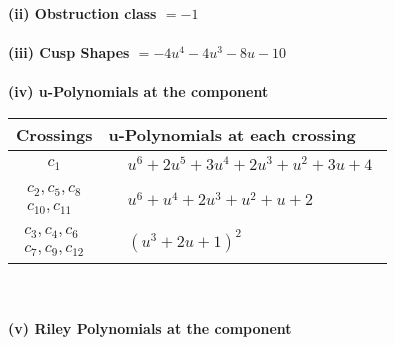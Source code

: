 \documentclass[1p]{elsarticle_modified}
\theoremstyle{definition}
\begin{document}
\flushleft \textbf{(ii) Obstruction class $= -1$}\\~\\
\flushleft \textbf{(iii) Cusp Shapes $= -4 u^4-4 u^3-8 u-10$}\\~\\
\newpage\renewcommand{\arraystretch}{1}
\flushleft \textbf{(iv) u-Polynomials at the component}\newline \\
\begin{tabular}{m{50pt}|m{274pt}}
Crossings & \hspace{64pt}u-Polynomials at each crossing \\
\hline $$\begin{aligned}c_{1}\end{aligned}$$&$\begin{aligned}
&u^6+2 u^5+3 u^4+2 u^3+u^2+3 u+4
\end{aligned}$\\
\hline $$\begin{aligned}c_{2},c_{5},c_{8}\\c_{10},c_{11}\end{aligned}$$&$\begin{aligned}
&u^6+u^4+2 u^3+u^2+u+2
\end{aligned}$\\
\hline $$\begin{aligned}c_{3},c_{4},c_{6}\\c_{7},c_{9},c_{12}\end{aligned}$$&$\begin{aligned}
&(u^3+2 u+1)^2
\end{aligned}$\\
\hline
\end{tabular}\\~\\
\newpage\renewcommand{\arraystretch}{1}
\flushleft \textbf{(v) Riley Polynomials at the component}\newline \\
\end{document}
